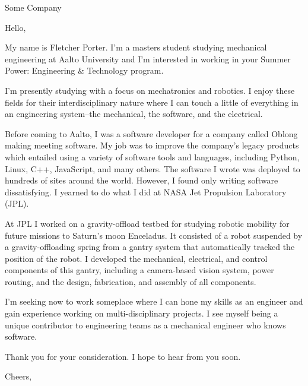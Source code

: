 \documentclass[12pt,american,german,british]{letter}
\date{\today}
\begin{document}
\raggedright

\begin{letter}{Some Company}

\opening{Hello,}

My name is Fletcher Porter.  I'm a masters student studying mechanical
engineering at Aalto University and I'm interested in working in your Summer
Power: Engineering \& Technology program.

I'm presently studying with a focus on mechatronics and robotics.  I enjoy
these fields for their interdisciplinary nature where I can touch a little of
everything in an engineering system--the mechanical, the software, and the
electrical.

Before coming to Aalto, I was a software developer for a company called Oblong
making meeting software.  My job was to improve the company's legacy products
which entailed using a variety of software tools and languages, including
Python, Linux, C++, JavaScript, and many others.  The software I wrote was
deployed to hundreds of sites around the world.  However, I found only writing
software dissatisfying.  I yearned to do what I did at NASA Jet
Propulsion Laboratory (JPL).

At JPL I worked on a gravity-offload testbed for studying robotic mobility for
future missions to Saturn's moon Enceladus.  It consisted of a robot suspended
by a gravity-offloading spring from a gantry system that automatically tracked
the position of the robot.  I developed the mechanical, electrical, and control
components of this gantry, including a camera-based vision system, power
routing, and the design, fabrication, and assembly of all components.

I'm seeking now to work someplace where I can hone my skills as an engineer and
gain experience working on multi-disciplinary projects.  I see myself being a
unique contributor to engineering teams as a mechanical engineer who knows
software.

Thank you for your consideration.  I hope to hear from you soon.


\closing{Cheers,}

\end{letter}
\end{document}
